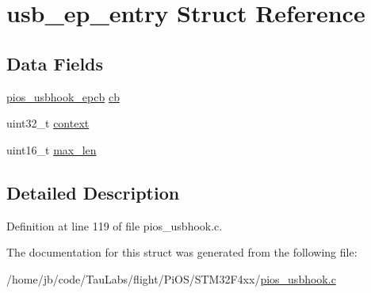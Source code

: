 \hypertarget{structusb__ep__entry}{\section{usb\-\_\-ep\-\_\-entry \-Struct \-Reference}
\label{structusb__ep__entry}
}
\subsection*{\-Data \-Fields}
\begin{DoxyCompactItemize}
\item 
\hyperlink{group___p_i_o_s___u_s_b_h_o_o_k_ga5f7904cd3922ab7207afebe3d9ef2650}{pios\-\_\-usbhook\-\_\-epcb} \hyperlink{group___p_i_o_s___u_s_b_h_o_o_k_gaf0106468de445de05247315a6001789c}{cb}
\item 
uint32\-\_\-t \hyperlink{group___p_i_o_s___u_s_b_h_o_o_k_ga044e4671681d96fdf1918abb9e52542e}{context}
\item 
uint16\-\_\-t \hyperlink{group___p_i_o_s___u_s_b_h_o_o_k_ga010957cf5bf2628ba64249b8c1271f91}{max\-\_\-len}
\end{DoxyCompactItemize}


\subsection{\-Detailed \-Description}


\-Definition at line 119 of file pios\-\_\-usbhook.\-c.



\-The documentation for this struct was generated from the following file\-:\begin{DoxyCompactItemize}
\item 
/home/jb/code/\-Tau\-Labs/flight/\-Pi\-O\-S/\-S\-T\-M32\-F4xx/\hyperlink{_s_t_m32_f4xx_2pios__usbhook_8c}{pios\-\_\-usbhook.\-c}\end{DoxyCompactItemize}
